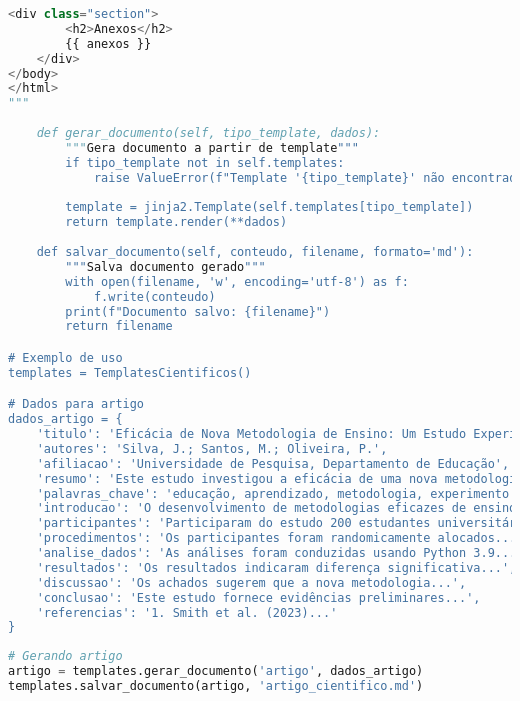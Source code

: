 \begin{pythonbox}
\begin{lstlisting}[language=Python]       
    <div class="section">
        <h2>Anexos</h2>
        {{ anexos }}
    </div>
</body>
</html>
"""
    
    def gerar_documento(self, tipo_template, dados):
        """Gera documento a partir de template"""
        if tipo_template not in self.templates:
            raise ValueError(f"Template '{tipo_template}' não encontrado")
        
        template = jinja2.Template(self.templates[tipo_template])
        return template.render(**dados)
    
    def salvar_documento(self, conteudo, filename, formato='md'):
        """Salva documento gerado"""
        with open(filename, 'w', encoding='utf-8') as f:
            f.write(conteudo)
        print(f"Documento salvo: {filename}")
        return filename

# Exemplo de uso
templates = TemplatesCientificos()

# Dados para artigo
dados_artigo = {
    'titulo': 'Eficácia de Nova Metodologia de Ensino: Um Estudo Experimental',
    'autores': 'Silva, J.; Santos, M.; Oliveira, P.',
    'afiliacao': 'Universidade de Pesquisa, Departamento de Educação',
    'resumo': 'Este estudo investigou a eficácia de uma nova metodologia de ensino...',
    'palavras_chave': 'educação, aprendizado, metodologia, experimento',
    'introducao': 'O desenvolvimento de metodologias eficazes de ensino...',
    'participantes': 'Participaram do estudo 200 estudantes universitários...',
    'procedimentos': 'Os participantes foram randomicamente alocados...',
    'analise_dados': 'As análises foram conduzidas usando Python 3.9...',
    'resultados': 'Os resultados indicaram diferença significativa...',
    'discussao': 'Os achados sugerem que a nova metodologia...',
    'conclusao': 'Este estudo fornece evidências preliminares...',
    'referencias': '1. Smith et al. (2023)...'
}
   \end{lstlisting}
\end{pythonbox}

\begin{pythonbox}
\begin{lstlisting}[language=Python]       
# Gerando artigo
artigo = templates.gerar_documento('artigo', dados_artigo)
templates.salvar_documento(artigo, 'artigo_cientifico.md')
\end{lstlisting}
\end{pythonbox}

